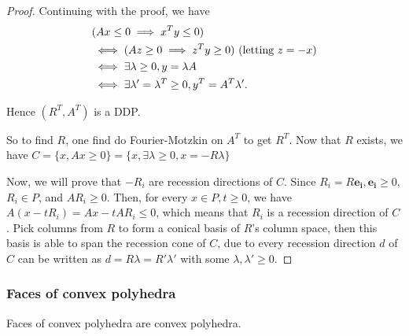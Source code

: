 \begin{proof}
Continuing with the proof, we have
\begin{align*}
  &(Ax \le 0 \implies x^{T}y \le 0)\\
  &\iff(Az \ge  0 \implies z^{T}y \ge  0) \text{ (letting \( z = -x \))}\\
  &\iff \exists \lambda \ge 0,  y = \lambda A\\
  &\iff \exists  \lambda' = \lambda^{T} \ge 0, y^{T} = A^{T}\lambda'
.\end{align*}

Hence \( (R^{T}, A^{T}) \) is a DDP.

So to find \( R \), one find do Fourier-Motzkin on \( A^{T} \) to get \( R^{T}
\). Now that \( R \) exists, we have \( C = \{x, Ax \ge 0\} = \{x, \exists
\lambda \ge 0, x = -R\lambda\}  \)

Now, we will prove that \( -R_{i} \) are recession directions of \( C \).
Since \( R_{i} = R\mathbf{e_{i}}, \mathbf{e_{i}} \ge 0 \), \( R_{i} \in P \),
and \( AR_{i} \ge  0 \). Then, for every \( x \in P, t \ge 0 \), we have \( A(x
- tR_{i}) = Ax - tAR_{i} \le  0 \), which means that \( R_{i} \) is a recession
direction of \( C \). Pick columns from \( R \) to form a conical basis of \( R \)'s
column space, then this basis is able to span the recession cone of \( C \), due
to every recession direction \( d \) of \( C \) can be written as \( d =
R\lambda = R'\lambda' \) with some \( \lambda, \lambda' \ge  0 \).
\end{proof}

\fi
\subsubsection{Faces of convex polyhedra} %
\label{sec:Faces of convex polyhedra}

\begin{theorem}
\label{thr:Basic properties of faces}
Faces of convex polyhedra are convex polyhedra.
\end{theorem}

